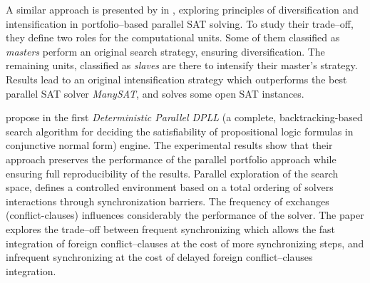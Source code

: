 A similar approach is presented by  in \cite{Guo2010}, exploring principles of diversification and intensification in portfolio--based parallel SAT solving. To study their trade--off, they define two roles for the computational units. Some of them classified as {\it masters} perform an original search strategy, ensuring diversification. The remaining units, classified as {\it slaves} are there to intensify their master's strategy. 
Results lead to an original intensification strategy which outperforms the best parallel SAT solver {\it ManySAT}, and solves some open SAT instances.

 propose in \cite{Hamadi2011} the first {\it Deterministic Parallel DPLL} (a complete, backtracking-based search algorithm for deciding the satisfiability of propositional logic formulas in conjunctive normal form) engine. The experimental results show that their approach preserves the performance of the parallel portfolio approach while ensuring full reproducibility of the results. Parallel exploration of the search space, defines a controlled environment based on a total ordering of solvers interactions through synchronization barriers. The frequency of exchanges (conflict-clauses) influences considerably the performance of the solver. The paper explores the trade--off between frequent synchronizing which allows the fast integration of foreign conflict--clauses at the cost of more synchronizing steps, and infrequent synchronizing at the cost of delayed foreign conflict--clauses integration.

